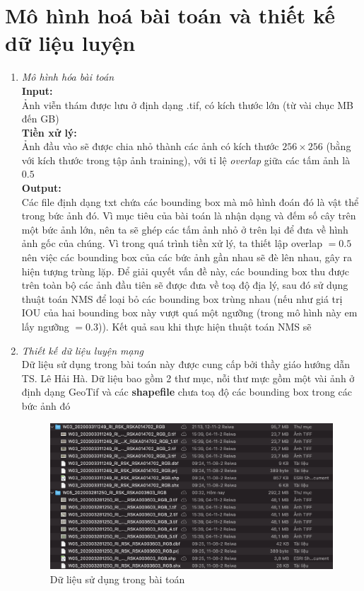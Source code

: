 \documentclass[a4paper, 12pt]{report}
\begin{document}
\section{Mô hình hoá bài toán và thiết kế dữ liệu luyện}
\begin{enumerate}[label= \textit{\alph*)}]
\item \textit{Mô hình hóa bài toán} \\
\textbf{Input:} \\
Ảnh viễn thám được lưu ở định dạng .tif, có kích thước lớn (từ vài chục MB đến GB) \\ \textbf{Tiền xử lý:} \\
Ảnh đầu vào sẽ được chia nhỏ thành các ảnh có kích thước $256 \times 256$ (bằng với kích thước trong tập ảnh training),  với tỉ lệ \textit{overlap} giữa các tấm ảnh là $0.5$ \\
\textbf{Output:} \\
Các file định dạng txt chứa các bounding box mà mô hình đoán đó là vật thể trong bức ảnh đó.  
Vì mục tiêu của bài toán là nhận dạng và đếm số cây trên một bức ảnh lớn,  nên ta sẽ ghép các tấm ảnh nhỏ ở trên lại để đưa về hình ảnh gốc của chúng.  Vì trong quá trình tiền xử lý, ta thiết lập overlap $= 0.5$ nên việc các bounding box của các bức ảnh gần nhau sẽ đè lên nhau,  gây ra hiện tượng trùng lặp.  Để giải quyết vấn đề này,  các bounding box thu được trên toàn bộ các ảnh đầu tiên sẽ được đưa về toạ độ địa lý, sau đó sử dụng thuật toán NMS để loại bỏ các bounding box trùng nhau (nếu như giá trị IOU của hai bounding box này vượt quá một ngưỡng (trong mô hình này em lấy ngưỡng $=0.3$)).  Kết quả sau khi thực hiện thuật toán NMS sẽ 


\item \textit{Thiết kế dữ liệu luyện mạng} \\
Dữ liệu sử dụng trong bài toán này được cung cấp bởi thầy giáo hướng dẫn TS.  Lê Hải Hà.  Dữ liệu bao gồm 2 thư mục,  nỗi thư mực gồm một vài ảnh ở định dạng GeoTif và các \textbf{shapefile} chưa toạ độ các bounding box trong các bức ảnh đó
 \begin{figure}[!htb]
	\centering
	\includegraphics[width=1\linewidth]{Images/data_folder}
	\caption{Dữ liệu sử dụng trong bài toán}
	\label{fig:data_folder}
\end{figure}


\end{enumerate}
\end{document}
